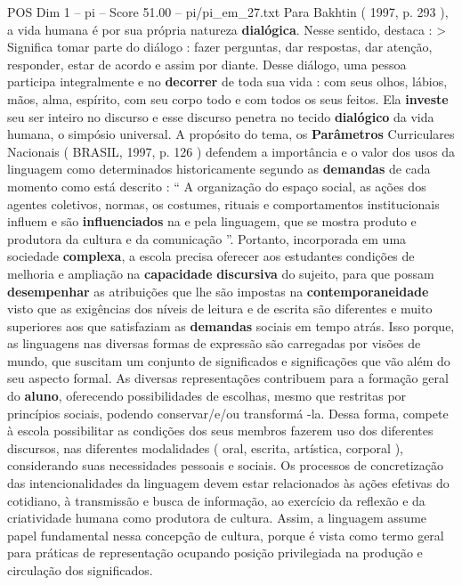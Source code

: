 \begin{textsample}{POS Dim 1 – pi – Score 51.00 – pi/pi\_em\_27.txt}
Para Bakhtin ( 1997, p. 293 ), a vida humana é por sua própria natureza \textbf{dialógica}.
Nesse sentido, destaca : > Significa tomar parte do diálogo : fazer perguntas, dar respostas, dar atenção, responder, estar de acordo e assim por diante.
Desse diálogo, uma pessoa participa integralmente e no \textbf{decorrer} de toda sua vida : com seus olhos, lábios, mãos, alma, espírito, com seu corpo todo e com todos os seus feitos.
Ela \textbf{investe} seu ser inteiro no discurso e esse discurso penetra no tecido \textbf{dialógico} da vida humana, o simpósio universal.
A propósito do tema, os \textbf{Parâmetros} Curriculares Nacionais ( BRASIL, 1997, p. 126 ) defendem a importância e o valor dos usos da linguagem como determinados historicamente segundo as \textbf{demandas} de cada momento como está descrito : “ A organização do espaço social, as ações dos agentes coletivos, normas, os costumes, rituais e comportamentos institucionais influem e são \textbf{influenciados} na e pela linguagem, que se mostra produto e produtora da cultura e da comunicação ”.
Portanto, incorporada em uma sociedade \textbf{complexa}, a escola precisa oferecer aos estudantes condições de melhoria e ampliação na \textbf{capacidade} \textbf{discursiva} do sujeito, para que possam \textbf{desempenhar} as atribuições que lhe são impostas na \textbf{contemporaneidade} visto que as exigências dos níveis de leitura e de escrita são diferentes e muito superiores aos que satisfaziam as \textbf{demandas} sociais em tempo atrás.
Isso porque, as linguagens nas diversas formas de expressão são carregadas por visões de mundo, que suscitam um conjunto de significados e significações que vão além do seu aspecto formal.
As diversas representações contribuem para a formação geral do \textbf{aluno}, oferecendo possibilidades de escolhas, mesmo que restritas por princípios sociais, podendo conservar/e/ou transformá -la.
Dessa forma, compete à escola possibilitar as condições dos seus membros fazerem uso dos diferentes discursos, nas diferentes modalidades ( oral, escrita, artística, corporal ), considerando suas necessidades pessoais e sociais.
Os processos de concretização das intencionalidades da linguagem devem estar relacionados às ações efetivas do cotidiano, à transmissão e busca de informação, ao exercício da reflexão e da criatividade humana como produtora de cultura.
Assim, a linguagem assume papel fundamental nessa concepção de cultura, porque é vista como termo geral para práticas de representação ocupando posição privilegiada na produção e circulação dos significados.

\end{textsample}
